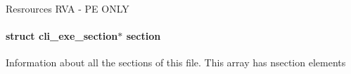 \label{structcli__exe__info_ac0f1b36bb8a1eeb981958dc4643f67dd}
Resrources RVA -\/ PE ONLY \hypertarget{structcli__exe__info_a1c449c2a02971006b72d8ab755684716}{
\paragraph[{section}]{\setlength{\rightskip}{0pt plus 5cm}struct {\bf cli\_\-exe\_\-section}$\ast$ {\bf section}}}
\label{structcli__exe__info_a1c449c2a02971006b72d8ab755684716}
Information about all the sections of this file. This array has {\ttfamily nsection} elements 